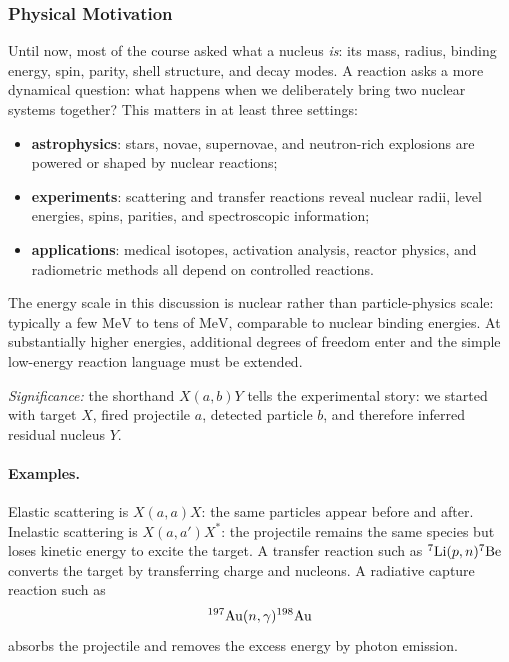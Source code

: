 \subsubsection*{Physical Motivation}
Until now, most of the course asked what a nucleus \emph{is}: its mass, radius,
binding energy, spin, parity, shell structure, and decay modes. A reaction asks a
more dynamical question: what happens when we deliberately bring two nuclear
systems together? This matters in at least three settings:
\begin{itemize}[nosep]
  \item \textbf{astrophysics}: stars, novae, supernovae, and neutron-rich
        explosions are powered or shaped by nuclear reactions;
  \item \textbf{experiments}: scattering and transfer reactions reveal nuclear
        radii, level energies, spins, parities, and spectroscopic information;
  \item \textbf{applications}: medical isotopes, activation analysis, reactor
        physics, and radiometric methods all depend on controlled reactions.
\end{itemize}
The energy scale in this discussion is nuclear rather than particle-physics
scale: typically a few $\text{MeV}$ to tens of $\text{MeV}$, comparable to
nuclear binding energies. At substantially higher energies, additional degrees
of freedom enter and the simple low-energy reaction language must be extended.

\textit{Significance:} the shorthand $X(a,b)Y$ tells the experimental story:
we started with target $X$, fired projectile $a$, detected particle $b$, and
therefore inferred residual nucleus $Y$.

\paragraph{Examples.}
Elastic scattering is $X(a,a)X$: the same particles appear before and after.
Inelastic scattering is $X(a,a')X^\ast$: the projectile remains the same species
but loses kinetic energy to excite the target. A transfer reaction such as
$\nucleus{Li}{7}(p,n)\nucleus{Be}{7}$ converts the target by transferring charge
and nucleons. A radiative capture reaction such as
\begin{equation}
  \label{eq:lec10:radiative_capture_example}
  \nucleus{Au}{197}(n,\gamma)\nucleus{Au}{198}
\end{equation}
absorbs the projectile and removes the excess energy by photon emission.

